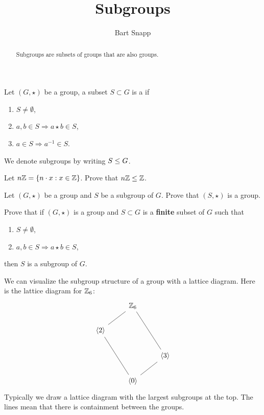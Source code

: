 \documentclass{ximera}
\author{Bart Snapp}
\title{Subgroups}
\begin{document}
\begin{abstract}
  Subgroups are subsets of groups that are also groups. 
\end{abstract}
\maketitle


\begin{definition}
  Let $(G,\star)$ be a group, a subset $S\subset G$ is a  if
  \begin{enumerate}
  \item $S \ne \emptyset$,
  \item $a,b\in S \Rightarrow a\star b\in S$,
  \item $a\in S \Rightarrow a^{-1}\in S$.
  \end{enumerate}
  We denote subgroups by writing $S\leq G$.
\end{definition}


\begin{exercise}
  Let $n\mathbb Z = \{n\cdot x : x\in \mathbb Z\}$. Prove that $n\mathbb Z\leq \mathbb Z$.
\end{exercise}


\begin{exercise}
  Let $(G,\star)$ be a group and $S$ be a subgroup of $G$. Prove that
  $(S,\star)$ is a group.
\end{exercise}

\begin{exercise}
  Prove that if $(G,\star)$ is a group and $S\subset G$ is a \textbf{finite}
  subset of $G$ such that
  \begin{enumerate}
  \item $S \ne \emptyset$,
  \item $a,b\in S \Rightarrow a\star b\in S$,
  \end{enumerate}
  then $S$ is a subgroup of $G$.
\end{exercise}


\begin{example}
  We can visualize the subgroup structure of a group with a lattice
  diagram. Here is the lattice diagram for $\mathbb Z_6$:
  \[
   \begin{tikzcd}
    & \Z_6 \ar[ld,-]  \ar[rdd,-] &       \\
    \<2\> \ar[rdd,-] &  &\\
   & &  \< 3\> \ar[ld,-]        \\   
    & \<0\> &
   \end{tikzcd}
   \]
  Typically we draw a lattice diagram with the largest subgroups at
  the top. The lines mean that there is containment between the groups.
\end{example}
\end{document}
